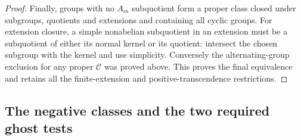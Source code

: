 \begin{proof}
Finally, groups with no \(A_m\) subquotient form a proper
class closed under subgroups, quotients and extensions and
containing all cyclic groups. For extension closure, a simple
nonabelian subquotient in an extension must be a subquotient
of either its normal kernel or its quotient: intersect the
chosen subgroup with the kernel and use simplicity.
Conversely the alternating-group exclusion for any proper
\(\mathcal C\) was proved above. This proves the final
equivalence and retains all the finite-extension and
positive-transcendence restrictions.
\end{proof}

\subsection{The negative classes and the two required ghost tests}

